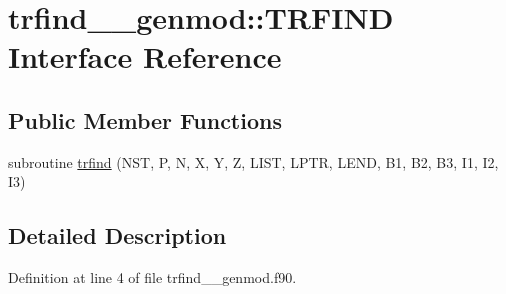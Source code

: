 \hypertarget{interfacetrfind____genmod_1_1TRFIND}{\section{trfind\+\_\+\+\_\+genmod\+:\+:T\+R\+F\+I\+N\+D Interface Reference}
\label{interfacetrfind____genmod_1_1TRFIND}
}
\subsection*{Public Member Functions}
\begin{DoxyCompactItemize}
\item 
subroutine \hyperlink{interfacetrfind____genmod_1_1TRFIND_a3ad39a238917837884dbd2874ce73096}{trfind} (N\+S\+T, P, N, X, Y, Z, L\+I\+S\+T, L\+P\+T\+R, L\+E\+N\+D, B1, B2, B3, I1, I2, I3)
\end{DoxyCompactItemize}


\subsection{Detailed Description}


Definition at line 4 of file trfind\+\_\+\+\_\+genmod.\+f90.



